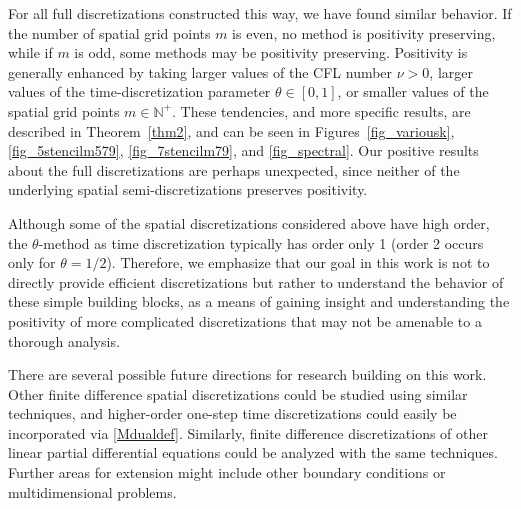 \documentclass[a4paper]{article}
\begin{document}
For all full discretizations constructed this way, we have found similar behavior.
If the number of spatial grid points $m$ is even, no method is positivity
preserving, while if $m$ is odd, some methods may be positivity
preserving.  Positivity is generally enhanced by taking larger values
of the CFL number $\nu>0$, larger values of the time-discretization parameter $\theta\in [0,1]$, or smaller
values of the spatial grid points $m\in\mathbb{N}^+$.  These tendencies, and more specific results, are described
in Theorem~\ref{thm2}, and can be seen
in Figures~\ref{fig_variousk}, \ref{fig_5stencilm579}, \ref{fig_7stencilm79},
and \ref{fig_spectral}.
Our positive results about the full discretizations are perhaps unexpected, since neither of the underlying spatial semi-discretizations preserves positivity.

Although some of the spatial discretizations considered above have high order, the $\theta$-method as time discretization typically has order only 1 (order 2 occurs only for $\theta=1/2$). Therefore, we emphasize that our goal in this work is not to directly provide efficient discretizations but rather
to understand the behavior of these simple building blocks, as a means
of gaining insight and understanding the positivity of more complicated
discretizations that may not be amenable to a thorough analysis.


There are several possible future directions for research building on this
work.  Other finite difference spatial discretizations could be studied
using similar techniques, and higher-order one-step time discretizations could
easily be incorporated via \eqref{Mdualdef}.  Similarly, finite difference
discretizations of other linear partial differential equations could be analyzed with the same techniques.
Further areas for extension might 
include other boundary conditions or
multidimensional problems.



\end{document}
